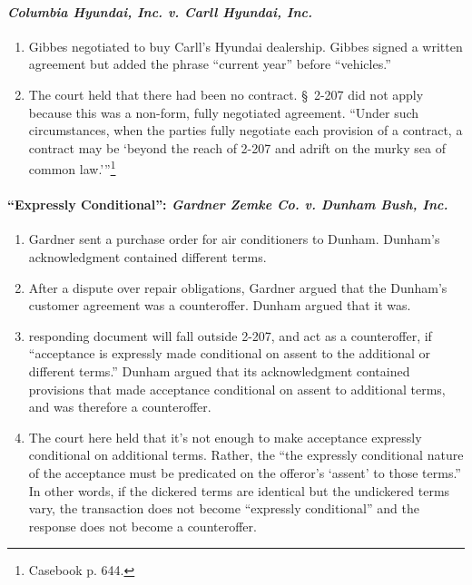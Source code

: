 \paragraph{\emph{Columbia Hyundai, Inc. v. Carll Hyundai, Inc.}}

\begin{enumerate}
    \item Gibbes negotiated to buy Carll's Hyundai dealership. Gibbes signed a 
    written agreement but added the phrase ``current year'' before 
    ``vehicles.''
    \item The court held that there had been no contract. \S\ 2-207 did not 
    apply because this was a non-form, fully negotiated agreement. \enquote{Under 
    such circumstances, when the parties fully negotiate each provision of a 
    contract, a contract may be \enquote{beyond the reach of 2-207 and adrift 
    on the murky sea of common law.}}\footnote{Casebook p. 644.}
\end{enumerate}

\paragraph{``Expressly Conditional'': \emph{Gardner Zemke Co. v. Dunham Bush, 
Inc.}}

\begin{enumerate}
    \item Gardner sent a purchase order for air conditioners to Dunham.  
    Dunham's acknowledgment contained different terms.
    \item After a dispute over repair obligations, Gardner argued that the 
    Dunham's customer agreement was a counteroffer. Dunham argued that it was.
    \item  responding document will fall outside 2-207, and act as a 
    counteroffer, if ``acceptance is expressly made conditional on assent to 
    the additional or different terms.'' Dunham argued that its acknowledgment 
    contained provisions that made acceptance conditional on assent to 
    additional terms, and was therefore a counteroffer.
    \item The court here held that it's not enough to make acceptance 
    expressly conditional on additional terms. Rather, the ``the expressly 
    conditional nature of the acceptance must be predicated on the offeror's 
    `assent' to those terms.'' In other words, if the dickered terms are 
    identical but the undickered terms vary, the transaction does not become 
    ``expressly conditional'' and the response does not become a counteroffer.
\end{enumerate}

